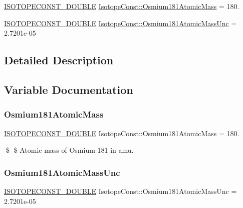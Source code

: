 \begin{DoxyCompactItemize}
\item 
\mbox{\hyperlink{group___isotope_const-_macros_ga8f45a7272ce02c0b4c65c44636ed719a}{I\+S\+O\+T\+O\+P\+E\+C\+O\+N\+S\+T\+\_\+\+D\+O\+U\+B\+LE}} \mbox{\hyperlink{group___isotope_const-_osmium-_os181_ga5211011baee996b146b54dde307584bb}{Isotope\+Const\+::\+Osmium181\+Atomic\+Mass}} = 180.
\item 
\mbox{\hyperlink{group___isotope_const-_macros_ga8f45a7272ce02c0b4c65c44636ed719a}{I\+S\+O\+T\+O\+P\+E\+C\+O\+N\+S\+T\+\_\+\+D\+O\+U\+B\+LE}} \mbox{\hyperlink{group___isotope_const-_osmium-_os181_ga982353484692c4af6ed67313790589f9}{Isotope\+Const\+::\+Osmium181\+Atomic\+Mass\+Unc}} = 2.\+7201e-\/05
\end{DoxyCompactItemize}


\subsection{Detailed Description}


\subsection{Variable Documentation}
\mbox{\label{group___isotope_const-_osmium-_os181_ga5211011baee996b146b54dde307584bb}} 
\subsubsection{\texorpdfstring{Osmium181\+Atomic\+Mass}{Osmium181AtomicMass}}
{\footnotesize\ttfamily \mbox{\hyperlink{group___isotope_const-_macros_ga8f45a7272ce02c0b4c65c44636ed719a}{I\+S\+O\+T\+O\+P\+E\+C\+O\+N\+S\+T\+\_\+\+D\+O\+U\+B\+LE}} Isotope\+Const\+::\+Osmium181\+Atomic\+Mass = 180.}

\$ \$ Atomic mass of Osmium-\/181 in amu. \mbox{\label{group___isotope_const-_osmium-_os181_ga982353484692c4af6ed67313790589f9}} 
\subsubsection{\texorpdfstring{Osmium181\+Atomic\+Mass\+Unc}{Osmium181AtomicMassUnc}}
{\footnotesize\ttfamily \mbox{\hyperlink{group___isotope_const-_macros_ga8f45a7272ce02c0b4c65c44636ed719a}{I\+S\+O\+T\+O\+P\+E\+C\+O\+N\+S\+T\+\_\+\+D\+O\+U\+B\+LE}} Isotope\+Const\+::\+Osmium181\+Atomic\+Mass\+Unc = 2.\+7201e-\/05}


